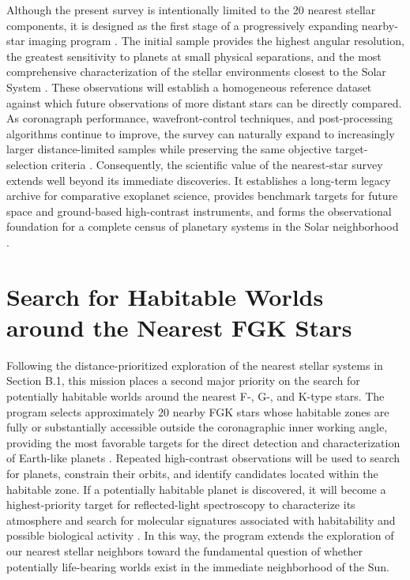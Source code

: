 Although the present survey is intentionally limited to the 20 nearest stellar components, it is designed as the first stage of a progressively expanding nearby-star imaging program \cite{LUVOIR2019}. 
The initial sample provides the highest angular resolution, the greatest sensitivity to planets at small physical separations, and the most comprehensive characterization of the stellar environments closest to the Solar System \cite{Guyon2006}. 
These observations will establish a homogeneous reference dataset against which future observations of more distant stars can be directly compared. As coronagraph performance, wavefront-control techniques, and post-processing algorithms continue to improve, the survey can naturally expand to increasingly larger distance-limited samples while preserving the same objective target-selection criteria \cite{Currie2022}. 
Consequently, the scientific value of the nearest-star survey extends well beyond its immediate discoveries. It establishes a long-term legacy archive for comparative exoplanet science, provides benchmark targets for future space and ground-based high-contrast instruments, and forms the observational foundation for a complete census of planetary systems in the Solar neighborhood \cite{LUVOIR2019}.

% 
\section{Search for Habitable Worlds around the Nearest FGK Stars}
\label{sec:Search-Habitable}

Following the distance-prioritized exploration of the nearest stellar systems in 
Section B.1, this mission places a second major priority on the search for potentially 
habitable worlds around the nearest F-, G-, and K-type stars. The program selects 
approximately 20 nearby FGK stars whose habitable zones are fully or substantially 
accessible outside the coronagraphic inner working angle, providing the most favorable 
targets for the direct detection and characterization of Earth-like planets
\cite{kopparapu13,Stark2014}. Repeated high-contrast observations will be used to 
search for planets, constrain their orbits, and identify candidates located within the 
habitable zone. If a potentially habitable planet is discovered, it will become a 
highest-priority target for reflected-light spectroscopy to characterize its atmosphere 
and search for molecular signatures associated with habitability and possible biological 
activity \cite{Schwieterman2018}. In this way, the program extends the exploration of 
our nearest stellar neighbors toward the fundamental question of whether potentially 
life-bearing worlds exist in the immediate neighborhood of the Sun.

